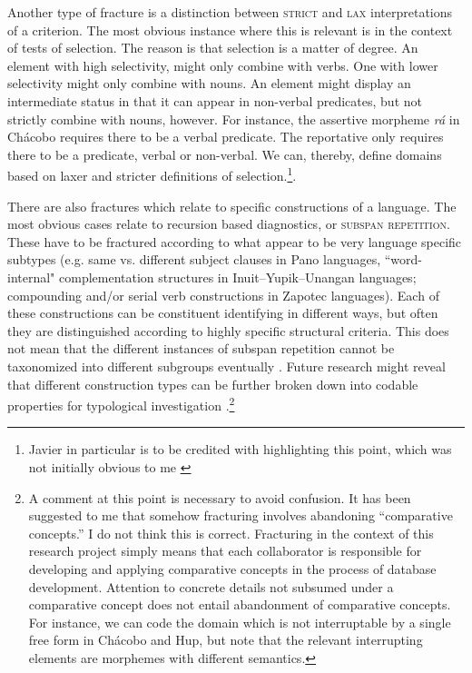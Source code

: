 \documentclass[output=paper,hidelinks]{langscibook}
\begin{document}
Another type of fracture is a distinction between \textsc{strict} and \textsc{lax} interpretations of a criterion. The most obvious instance where this is relevant is in the context of tests of selection. The reason is that selection is a matter of degree. An element with high selectivity, might only combine with verbs. One with lower selectivity might only combine with nouns. An element might display an intermediate status in that it can appear in non-verbal predicates, but not strictly combine with nouns, however. For instance, the assertive morpheme \textit{rá} in Chácobo requires there to be a verbal predicate. The reportative only requires there to be a predicate, verbal or non-verbal. We can, thereby, define domains based on laxer and stricter definitions of selection.\footnote{Javier
     in particular is to be credited with highlighting this point, which was not initially obvious to me \citep{tallman2021constituency}}.

There are also fractures which relate to specific constructions of a language. The most obvious cases relate to recursion based diagnostics, or \textsc{subspan repetition}. These have to be fractured according to what appear to be very language specific subtypes (e.g. same vs. different subject clauses in Pano languages, ``word-internal" complementation structures in Inuit–Yupik–Unangan languages; compounding and/or serial verb constructions in Zapotec languages). Each of these constructions can be constituent identifying in different ways, but often they are distinguished according to highly specific structural criteria. This does not mean that the different instances of subspan repetition cannot be taxonomized into different subgroups eventually \citep{bickel2015distributional}. Future research might reveal that different construction types can be further broken down into codable properties for typological investigation \citep{bickel:capturing}.\footnote{A comment at this point is necessary to avoid confusion. It has been suggested to me that somehow fracturing involves abandoning ``comparative concepts.'' I do not think this is correct. Fracturing in the context of this research project simply means that each collaborator is responsible for developing and applying comparative concepts in the process of database development. Attention to concrete details not subsumed under a comparative concept does not entail abandonment of comparative concepts. For instance, we can code the domain which is not interruptable by a single free form in Chácobo and Hup, but note that the relevant interrupting elements are morphemes with different semantics.}
\end{document}
